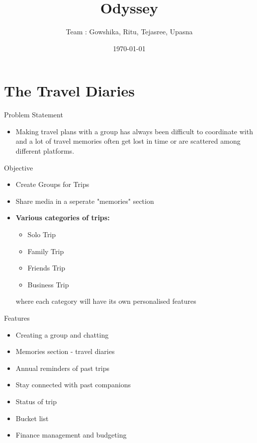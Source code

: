 \documentclass[14pt]{beamer}
\title{\textbf{Odyssey}}
\author{Team : Gowshika, Ritu, Tejasree, Upasna}
\date{\today}
\begin{document}
\maketitle 

\section{The Travel Diaries}
\begin{frame}{Problem Statement}
    \begin{itemize}
         \item Making travel plans with a group has always been difficult to coordinate with and
        \alert{a lot of travel memories often get lost} in time or are scattered among different platforms.                   
    \end{itemize}
\end{frame}

\begin{frame}{Objective}
\begin{itemize}
     \item Create Groups for Trips
     \item Share media in a seperate "memories" section  
     \item \textbf{Various categories of trips:}
     \begin{itemize}
         \item \alert{Solo Trip}
         \item \alert{Family Trip }
         \item \alert{Friends Trip}
         \item \alert{Business Trip}
     \end{itemize}
     where each category will have its own personalised features
\end{itemize}    
\end{frame}

\begin{frame}{Features}
\begin{itemize} 
    \item Creating a group and chatting
    \item Memories section - travel diaries
    \item Annual reminders of past trips
    \item Stay connected with past companions
    \item Status of trip
    \item Bucket list
    \item Finance management and budgeting
\end{itemize}  
\end{frame}
\end{document}
